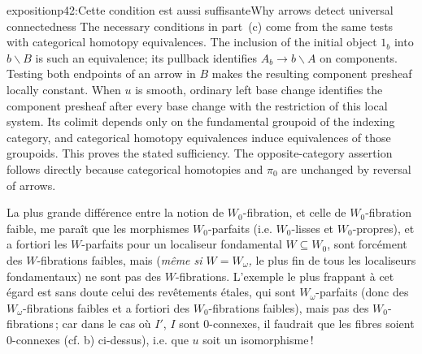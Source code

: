 \begin{dcomment}{exposition}{p42:Cette condition est aussi suffisante}{Why arrows detect universal connectedness}
The necessary conditions in part~(c) come from the same tests with categorical homotopy equivalences. The inclusion of the initial object $1_b$ into $b\backslash B$ is such an equivalence; its pullback identifies $A_b\longrightarrow b\backslash A$ on components. Testing both endpoints of an arrow in $B$ makes the resulting component presheaf locally constant. When $u$ is smooth, ordinary left base change identifies the component presheaf after every base change with the restriction of this local system. Its colimit depends only on the fundamental groupoid of the indexing category, and categorical homotopy equivalences induce equivalences of those groupoids. This proves the stated sufficiency. The opposite-category assertion follows directly because categorical homotopies and $\pi_0$ are unchanged by reversal of arrows.
\end{dcomment}


La plus grande différence entre la notion de $W_0$-fibration, et celle de $W_0$-fibration faible, me paraît que les morphismes $W_0$-parfaits (i.e. $W_0$-lisses et $W_0$-propres), et a fortiori les $W$-parfaits pour un localiseur fondamental $W \subseteq W_0$, sont forcément des $W$-fibrations faibles, mais (\textit{même si $W = W_\omega$,} le plus fin de tous les localiseurs fondamentaux) ne sont pas des $W$-fibrations. L'exemple le plus frappant à cet égard est sans doute celui des revêtements étales, qui sont $W_\omega$-parfaits (donc
des $W_\omega$-fibrations faibles et a fortiori des $W_0$-fibrations faibles), mais pas des $W_0$-fibrations\,; car dans le cas où $I'$, $I$ sont 0-connexes, il faudrait que les fibres soient 0-connexes (cf. b) ci-dessus), i.e. que $u$ soit un isomorphisme\,!

